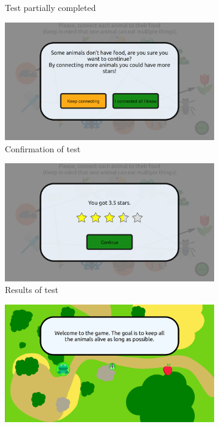 \begin{figure}[ht]
\begin{subfigure}[b]{0.325\textwidth}
		\caption{Test partially completed}
		\label{fig:tuto_test_partial}
	\end{subfigure}
	\centering
	\begin{subfigure}[b]{0.325\textwidth}
		\centering
		\includegraphics[width=\textwidth]{game_sequence/confirmation.png}
		\caption{Confirmation of test}
		\label{fig:tuto_test_confirmation}
	\end{subfigure}
	\centering
	\begin{subfigure}[b]{0.325\textwidth}
		\centering
		\includegraphics[width=\textwidth]{game_sequence/resulttest.png}
		\caption{Results of test}
		\label{fig:tuto_test_results}
	\end{subfigure}
	\centering
	\begin{subfigure}[b]{0.325\textwidth}
		\centering
		\includegraphics[width=\textwidth]{game_sequence/introtuto.png}

\end{subfigure}
\end{figure}
